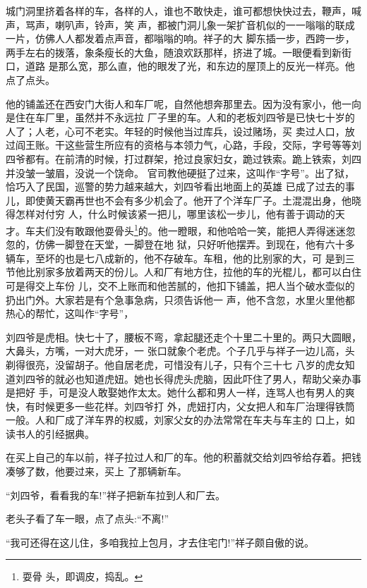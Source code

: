 \documentclass[11pt,a4paper,onecolumn]{article}
\begin{document}
城门洞里挤着各样的车，各样的人，谁也不敢快走，谁可都想快快过去，鞭声，喊声，骂声，喇叭声，铃声，笑
声，都被门洞儿\myrule 象一架扩音机似的一一嗡嗡的联成一片，仿佛人人都发着点声音，都嗡嗡的响。祥子的大
脚东插一步，西跨一步，两手左右的拨落，象条瘦长的大鱼，随浪欢跃那样，挤进了城。一眼便看到新街口，道路
是那么宽，那么直，他的眼发了光，和东边的屋顶上的反光一样亮。他点了点头。

他的铺盖还在西安门大街人和车厂呢，自然他想奔那里去。因为没有家小，他一向是住在车厂里，虽然并不永远拉
厂子里的车。人和的老板刘四爷是已快七十岁的人了；人老，心可不老实。年轻的时候他当过库兵，设过赌场，买
卖过人口，放过阎王账。干这些营生所应有的资格与本领\myrule 力气，心路，手段，交际，字号等等\myrule 刘
四爷都有。在前清的时候，打过群架，抢过良家妇女，跪过铁索。跪上铁索，刘四并没皱一皱眉，没说一个饶命。
官司教他硬挺了过来，这叫作``字号''。出了狱，恰巧入了民国，巡警的势力越来越大，刘四爷看出地面上的英雄
已成了过去的事儿，即使黄天霸再世也不会有多少机会了。他开了个洋车厂子。土混混出身，他晓得怎样对付穷
人，什么时候该紧一把儿，哪里该松一步儿，他有善于调动的天才。车夫们没有敢跟他耍骨头\footnote{耍骨
  头，即调皮，捣乱。}的。他一瞪眼，和他哈哈一笑，能把人弄得迷迷忽忽的，仿佛一脚登在天堂，一脚登在地
狱，只好听他摆弄。到现在，他有六十多辆车，至坏的也是七八成新的，他不存破车。车租，他的比别家的大，可
是到三节他比别家多放着两天的份儿。人和厂有地方住，拉他的车的光棍儿，都可以白住\myrule 可是得交上车份
儿，交不上账而和他苦腻的，他扣下铺盖，把人当个破水壶似的扔出门外。大家若是有个急事急病，只须告诉他一
声，他不含忽，水里火里他都热心的帮忙，这叫作``字号''，

刘四爷是虎相。快七十了，腰板不弯，拿起腿还走个十里二十里的。两只大圆眼，大鼻头，方嘴，一对大虎牙，一
张口就象个老虎。个子几乎与祥子一边儿高，头剃得很亮，没留胡子。他自居老虎，可惜没有儿子，只有个三十七
八岁的虎女\myrule 知道刘四爷的就必也知道虎妞。她也长得虎头虎脑，因此吓住了男人，帮助父亲办事是把好
手，可是没人敢娶她作太太。她什么都和男人一样，连骂人也有男人的爽快，有时候更多一些花样。刘四爷打
外，虎妞打内，父女把人和车厂治理得铁筒一般。人和厂成了洋车界的权威，刘家父女的办法常常在车夫与车主的
口上，如读书人的引经据典。

在买上自己的车以前，祥子拉过人和厂的车。他的积蓄就交给刘四爷给存着。把钱凑够了数，他要过来，买上
了那辆新车。

``刘四爷，看看我的车!''祥子把新车拉到人和厂去。

老头子看了车一眼，点了点头:``不离!''

``我可还得在这儿住，多咱我拉上包月，才去住宅门!''祥子颇自傲的说。
\end{document}
